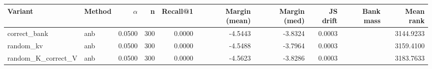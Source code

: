 \begin{tabular}{l l r r r r r r r r}
\toprule
Variant & Method & $\alpha$ & n & Recall@1 & Margin (mean) & Margin (med) & JS drift & Bank mass & Mean rank \\
\midrule
correct\_bank & anb & 0.0500 & 300 & 0.0000 & -4.5443 & -3.8324 & 0.0003 &  & 3144.9233 \\
random\_kv & anb & 0.0500 & 300 & 0.0000 & -4.5488 & -3.7964 & 0.0003 &  & 3159.4100 \\
random\_K\_correct\_V & anb & 0.0500 & 300 & 0.0000 & -4.5623 & -3.8286 & 0.0003 &  & 3183.7633 \\
\bottomrule
\end{tabular}
